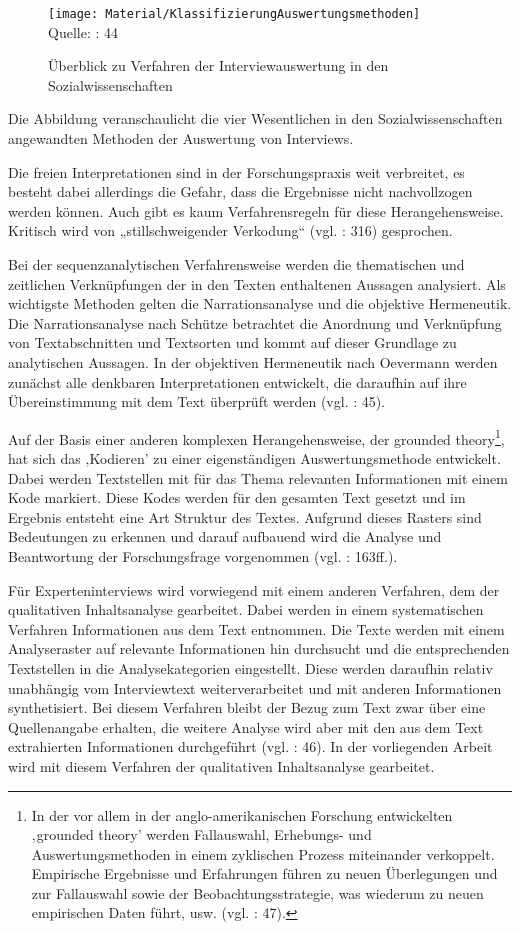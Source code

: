 \begin{figure}
\caption{Überblick zu Verfahren der Interviewauswertung in den Sozialwissenschaften}
\texttt{[image: Material/KlassifizierungAuswertungsmethoden]}\\
\scriptsize{Quelle: \cite{glalau10}: 44}
\end{figure}
Die Abbildung veranschaulicht die vier Wesentlichen in den Sozialwissenschaften angewandten Methoden der Auswertung von Interviews.\par
Die freien Interpretationen sind in der Forschungspraxis weit verbreitet, es besteht dabei allerdings die Gefahr, dass die Ergebnisse nicht nachvollzogen werden können. Auch gibt es kaum Verfahrensregeln für diese Herangehensweise. Kritisch wird von „stillschweigender Verkodung“ (vgl. \cite{hopf}: 316) gesprochen.\par
Bei der sequenzanalytischen Verfahrensweise werden die thematischen und zeitlichen Verknüpfungen der in den Texten enthaltenen Aussagen analysiert. Als wichtigste Methoden gelten die Narrationsanalyse und die objektive Hermeneutik. Die Narrationsanalyse nach Schütze betrachtet die Anordnung und Verknüpfung von Textabschnitten und Textsorten und kommt auf dieser Grundlage zu analytischen Aussagen. In der objektiven Hermeneutik nach Oevermann werden zunächst alle denkbaren Interpretationen entwickelt, die daraufhin auf ihre Übereinstimmung mit dem Text überprüft werden (vgl. \cite{glalau10}: 45).\par
Auf der Basis einer anderen komplexen Herangehensweise, der grounded theory\footnote{In der vor allem in der anglo-amerikanischen Forschung entwickelten ‚grounded theory’ werden Fallauswahl, Erhebungs- und Auswertungsmethoden in einem zyklischen Prozess miteinander verkoppelt. Empirische Ergebnisse und Erfahrungen führen zu neuen Überlegungen und zur Fallauswahl sowie der Beobachtungsstrategie, was wiederum zu neuen empirischen Daten führt, usw. (vgl. \cite{glalau10}: 47).}, hat sich das ‚Kodieren’ zu einer eigenständigen Auswertungsmethode entwickelt. Dabei werden Textstellen mit für das Thema relevanten Informationen mit einem Kode markiert. Diese Kodes werden für den gesamten Text gesetzt und im Ergebnis entsteht eine Art Struktur des Textes. Aufgrund dieses Rasters sind Bedeutungen zu erkennen und darauf aufbauend wird die Analyse und Beantwortung der Forschungsfrage vorgenommen (vgl. \cite{kruse}: 163ff.).\par
Für Experteninterviews wird vorwiegend mit einem anderen Verfahren, dem der qualitativen Inhaltsanalyse gearbeitet. Dabei werden in einem systematischen Verfahren Informationen aus dem Text entnommen. Die Texte werden mit einem Analyseraster auf relevante Informationen hin durchsucht und die entsprechenden Textstellen in die Analysekategorien eingestellt. Diese werden daraufhin relativ unabhängig vom Interviewtext weiterverarbeitet und mit anderen Informationen synthetisiert. Bei diesem Verfahren bleibt der Bezug zum Text zwar über eine Quellenangabe erhalten, die weitere Analyse wird aber mit den aus dem Text extrahierten Informationen durchgeführt (vgl. \cite{glalau10}: 46). In der vorliegenden Arbeit wird mit diesem Verfahren der qualitativen Inhaltsanalyse gearbeitet. \par
